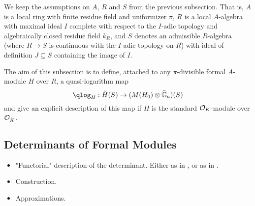 We keep the assumptions on $A$, $R$ and $S$ from the previous subsection. That is,
$A$ is a local ring with finite residue field and uniformizer $\pi$, 
$R$ is a local $A$-algebra with maximal ideal $I$ complete with respect to
the $I$-adic topology and algebraically closed residue field $k_R$, and 
$S$ denotes an admissible $R$-algebra (where $R \to S$ is continuous with
the $I$-adic topology on $R$) with ideal of definition $J \subseteq S$ containing
the image of $I$. 

The aim of this subsection is to define, attached to any $\pi$-divisible formal
$A$-module $H$ over $R$, a quasi-logarithm map
\begin{equation*}
  \qlog_H: \tilde H(S) \to (M(H_0) \otimes \GG_a)(S)
\end{equation*}
and give an explicit description of this map if $H$ is the standard $\mathcal{O}_K$-module
over $\mathcal{O}_{\breve K}$. 

\subsection{Determinants of Formal Modules} %
\label{sub:Determinants of Formal Modules}
\begin{itemize}
  \item "Functorial" description of the determinant. Either as in
    \cite{BoyarchenkoWeinstein2011MaxVar}, or as in \cite{weinstein2016semistable}.
  \item Construction.
  \item Approximations.
\end{itemize}


